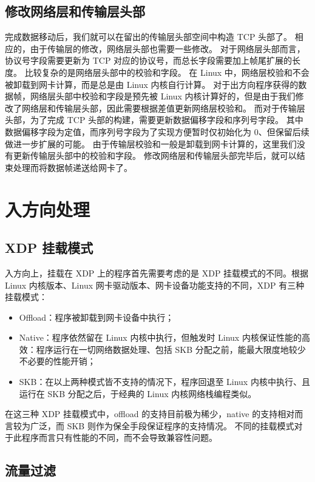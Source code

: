 \subsection{修改网络层和传输层头部}

完成数据移动后，我们就可以在留出的传输层头部空间中构造 TCP 头部了。
相应的，由于传输层的修改，网络层头部也需要一些修改。
对于网络层头部而言，协议号字段需要更新为 TCP 对应的协议号，而总长字段需要加上帧尾扩展的长度。
比较复杂的是网络层头部中的校验和字段。
在 Linux 中，网络层校验和不会被卸载到网卡计算，而是总是由 Linux 内核自行计算。
对于出方向程序获得的数据帧，网络层头部中校验和字段是预先被 Linux 内核计算好的，但是由于我们修改了网络层和传输层头部，因此需要根据差值更新网络层校验和。
而对于传输层头部，为了完成 TCP 头部的构建，需要更新数据偏移字段和序列号字段。
其中数据偏移字段为定值，而序列号字段为了实现方便暂时仅初始化为 0、但保留后续做进一步扩展的可能。
由于传输层校验和一般是卸载到网卡计算的，这里我们没有更新传输层头部中的校验和字段。
修改网络层和传输层头部完毕后，就可以结束处理而将数据帧递送给网卡了。

\section{入方向处理}

\subsection{XDP 挂载模式}

入方向上，挂载在 XDP 上的程序首先需要考虑的是 XDP 挂载模式的不同。根据 Linux 内核版本、Linux 网卡驱动版本、网卡设备功能支持的不同，XDP 有三种挂载模式：

\begin{itemize}
  \item Offload：程序被卸载到网卡设备中执行；
  \item Native：程序依然留在 Linux 内核中执行，但触发时 Linux 内核保证性能的高效：程序运行在一切网络数据处理、包括 SKB 分配之前，能最大限度地较少不必要的性能开销；
  \item SKB：在以上两种模式皆不支持的情况下，程序回退至 Linux 内核中执行、且运行在 SKB 分配之后，于经典的 Linux 内核网络栈编程类似。
\end{itemize}

在这三种 XDP 挂载模式中，offload 的支持目前极为稀少，native 的支持相对而言较为广泛，而 SKB 则作为保全手段保证程序的支持情况。
不同的挂载模式对于此程序而言只有性能的不同，而不会导致兼容性问题。

\subsection{流量过滤}

